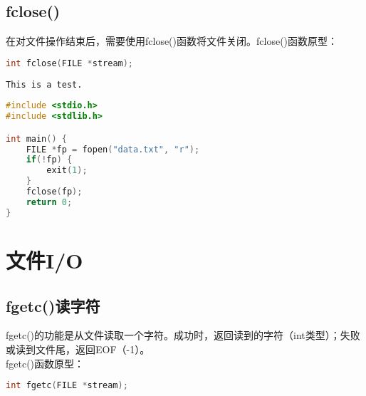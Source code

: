 \vspace{0.5cm}

\subsection{fclose()}

在对文件操作结束后，需要使用fclose()函数将文件关闭。fclose()函数原型：

\vspace{-0.5cm}

\begin{lstlisting}[language=C]
int fclose(FILE *stream);
\end{lstlisting}

\vspace{0.5cm}


\begin{lstlisting}[title=data.txt]
This is a test.
\end{lstlisting}

\begin{lstlisting}[language=C, title=file.c]
#include <stdio.h>
#include <stdlib.h>

int main() {
    FILE *fp = fopen("data.txt", "r");
    if(!fp) {
        exit(1);
    }
    fclose(fp);
    return 0;
}
\end{lstlisting}

\newpage

\section{文件I/O}

\subsection{fgetc()读字符}

fgetc()的功能是从文件读取一个字符。成功时，返回读到的字符（int类型）；失败或读到文件尾，返回EOF（-1）。\\

fgetc()函数原型：

\vspace{-0.5cm}

\begin{lstlisting}[language=C]
int fgetc(FILE *stream);
\end{lstlisting}

\vspace{0.5cm}


